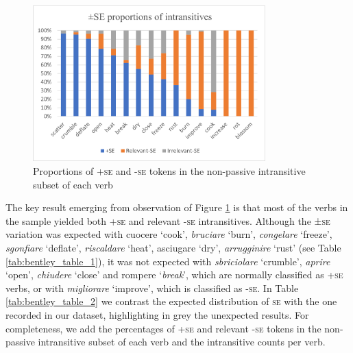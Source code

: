 \documentclass[output=paper,colorlinks,citecolor=brown
]{langscibook}
\begin{document}
\begin{figure}[hbt!]
\centering
\includegraphics[width=0.8\textwidth]{bentley_figure1.png}
\caption{\label{fig:bentley_figure_1}Proportions of +\textsc{se} and -\textsc{se} tokens in the non-passive intransitive subset of each verb}
\end{figure}    

The key result emerging from observation of Figure \ref{fig:bentley_figure_1} is that most of the verbs in the sample yielded both +\textsc{se} and relevant -\textsc{se} intransitives. Although the ±\textsc{se} variation was expected with cuocere ‘cook’, \textit{bruciare} ‘burn’, \textit{congelare} ‘freeze’, \textit{sgonfiare} ‘deflate’, \textit{riscaldare} ‘heat’, asciugare ‘dry’, \textit{arrugginire} ‘rust’ (see Table \ref{tab:bentley_table_1}), it was not expected with \textit{sbriciolare} ‘crumble’, \textit{aprire} ‘open’, \textit{chiudere} ‘close’ and rompere ‘\textit{break}’, which are normally classified as +\textsc{se} verbs, or with \textit{migliorare} ‘improve’, which is classified as -\textsc{se}. In Table \ref{tab:bentley_table_2} we contrast the expected distribution of \textsc{se} with the one recorded in our dataset, highlighting in grey the unexpected results. For completeness, we add the percentages of +\textsc{se} and relevant -\textsc{se} tokens in the non-passive intransitive subset of each verb and the intransitive counts per verb.
\end{document}
